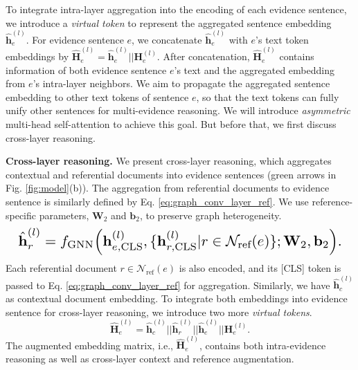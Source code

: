 To integrate intra-layer aggregation into the encoding of each evidence sentence, we introduce a \emph{virtual token} to represent the aggregated sentence embedding $ \hat{\textbf{h}}_e^{(l)} $. %
For evidence sentence $ e $, we concatenate $ \hat{\textbf{h}}_e^{(l)} $ with $ e $'s text token embeddings by $ \widehat{\textbf{H}}_e^{(l)}=\hat{\textbf{h}}_e^{(l)}||\textbf{H}_e^{(l)} $.
After concatenation, $ \widehat{\textbf{H}}_e^{(l)} $ contains information of both evidence sentence $ e $'s text and the aggregated embedding from $ e $'s intra-layer neighbors. We aim to propagate the aggregated sentence embedding to other text tokens of sentence $ e $, so that the text tokens can fully unify other sentences for multi-evidence reasoning. We will introduce \emph{asymmetric} multi-head self-attention to achieve this goal. But before that, we first discuss cross-layer reasoning.

\textbf{Cross-layer reasoning.} We present cross-layer reasoning, which aggregates contextual and referential documents into evidence sentences (green arrows in Fig. \ref{fig:model}(b)). The aggregation from referential documents to evidence sentence is similarly defined by Eq. \ref{eq:graph_conv_layer_ref}. We use reference-specific parameters, $ \textbf{W}_2 $ and $ \textbf{b}_2 $, to preserve graph heterogeneity.
\begin{equation}
\label{eq:graph_conv_layer_ref}
\resizebox{\columnwidth}{!}{
    $ \hat{\textbf{h}}_r^{(l)}=f_{\text{GNN}}\Big(\textbf{h}_{e,\text{CLS}}^{(l)},\{\textbf{h}_{r,\text{CLS}}^{(l)}|r\in\mathcal{N}_{\text{ref}}(e)\};\textbf{W}_2,\textbf{b}_2\Big). $
}
\end{equation}
Each referential document $ r\in\mathcal{N}_{\text{ref}}(e) $ is also encoded, and its [CLS] token is passed to Eq. \ref{eq:graph_conv_layer_ref} for aggregation. Similarly, we have $ \hat{\textbf{h}}_c^{(l)} $ as contextual document embedding. To integrate both embeddings into evidence sentence for cross-layer reasoning, we introduce two more \emph{virtual tokens}.
\begin{equation}
\label{eq:virtual_token}
    \widehat{\textbf{H}}_e^{(l)}=\hat{\textbf{h}}_c^{(l)}||\hat{\textbf{h}}_r^{(l)}||\hat{\textbf{h}}_e^{(l)}||\textbf{H}_e^{(l)}.
\end{equation}
The augmented embedding matrix, i.e., $ \widehat{\textbf{H}}_e^{(l)} $, contains both intra-evidence reasoning as well as cross-layer context and reference augmentation.

